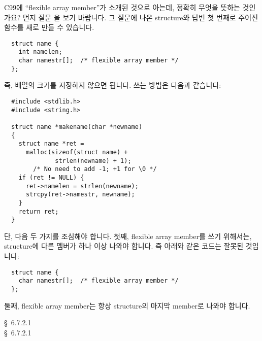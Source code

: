 \begin{faq}
	C99에 ``flexible array member''가 소개된 것으로 아는데, 정확히
        무엇을 뜻하는 것인가요?
\A
	먼저 질문 을 보기 바랍니다. 그 질문에 나온 structure와
        답변 첫 번째로 주어진  함수를 새로 만들 수 있습니다.

\begin{verbatim}
  struct name {
    int namelen;
    char namestr[];  /* flexible array member */
  };
\end{verbatim}

	\noindent 즉, 배열의 크기를 지정하지 않으면 됩니다. 쓰는 방법은
        다음과 같습니다:
\begin{verbatim}
  #include <stdlib.h>
  #include <string.h>

  struct name *makename(char *newname)
  {
    struct name *ret =
      malloc(sizeof(struct name) + 
              strlen(newname) + 1);
        /* No need to add -1; +1 for \0 */
    if (ret != NULL) {
      ret->namelen = strlen(newname);
      strcpy(ret->namestr, newname);
    }
    return ret;
  }
\end{verbatim}

	\noindent 단, 다음 두 가지를 조심해야 합니다. 첫째, flexible array
        member를 쓰기 위해서는, structure에 다른 멤버가 하나 이상 나와야
        합니다. 즉 아래와 같은 코드는 잘못된 것입니다:
\begin{verbatim}
  struct name {
    char namestr[];  /* flexible array member */
  };
\end{verbatim}
	\noindent 둘째, flexible array member는 항상 structure의 마지막 
        member로 나와야 합니다.

\R
	\cite{c99} \S\ 6.7.2.1 \\
        \cite{rational2} \S\ 6.7.2.1
\end{faq}

